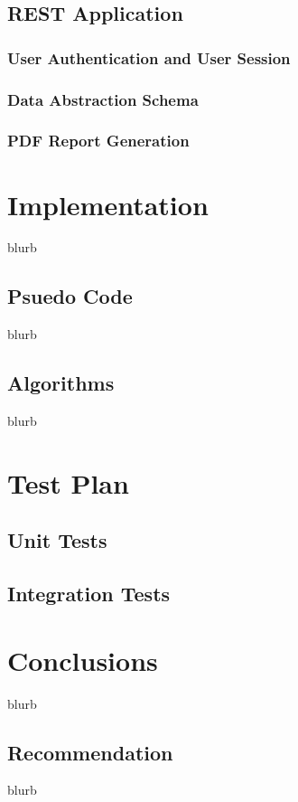 \documentclass{journal}
\begin{document}
\subsection{REST Application}

\subsubsection{User Authentication and User Session}

\subsubsection{Data Abstraction Schema}

\subsubsection{PDF Report Generation}

\section{Implementation}
blurb 
\subsection{Psuedo Code}
blurb
\subsection{Algorithms}
blurb 
\section{Test Plan}

\subsection{Unit Tests}

\subsection{Integration Tests}


\section{Conclusions}
blurb 
\subsection{Recommendation}
blurb 
\end{document}
